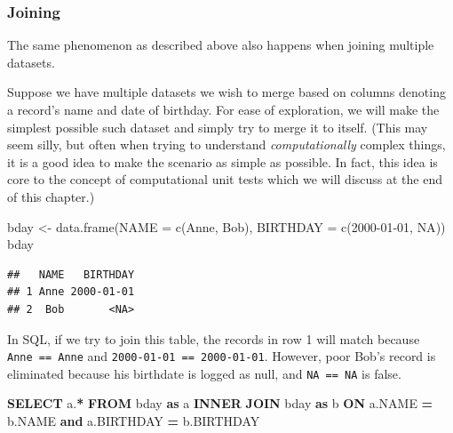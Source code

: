 \documentclass[
]{krantz}
\makeatletter
\newenvironment{Shaded}{\begin{snugshade}}{\end{snugshade}}
\newcommand{\AttributeTok}[1]{\textcolor[rgb]{0.61,0.61,0.61}{#1}}
\newcommand{\ConstantTok}[1]{\textcolor[rgb]{0,0,0}{#1}}
\newcommand{\FunctionTok}[1]{\textcolor[rgb]{0,0,0}{#1}}
\newcommand{\KeywordTok}[1]{\textcolor[rgb]{0.27,0.27,0.27}{\textbf{#1}}}
\newcommand{\NormalTok}[1]{#1}
\newcommand{\OperatorTok}[1]{\textcolor[rgb]{0.43,0.43,0.43}{\textbf{#1}}}
\newcommand{\OtherTok}[1]{\textcolor[rgb]{0.37,0.37,0.37}{#1}}
\newcommand{\StringTok}[1]{\textcolor[rgb]{0.5,0.5,0.5}{#1}}
\newenvironment{kframe}{%
\medskip{}
\setlength{\fboxsep}{.8em}
 \def\at@end@of@kframe{}%
 \ifinner\ifhmode%
  \def\at@end@of@kframe{\end{minipage}}%
  \begin{minipage}{\columnwidth}%
 \fi\fi%
 \def\FrameCommand##1{\hskip\@totalleftmargin \hskip-\fboxsep
 \colorbox{shadecolor}{##1}\hskip-\fboxsep
     \hskip-\linewidth \hskip-\@totalleftmargin \hskip\columnwidth}%
 \MakeFramed {\advance\hsize-\width
   \@totalleftmargin\z@ \linewidth\hsize
   \@setminipage}}%
 {\par\unskip\endMakeFramed%
 \at@end@of@kframe}
\renewenvironment{Shaded}{\begin{kframe}}{\end{kframe}}
\makeatother
\begin{document}
\hypertarget{joining}{%
\subsubsection{Joining}\label{joining}}

The same phenomenon as described above also happens when joining multiple datasets.

Suppose we have multiple datasets we wish to merge based on columns denoting a record's name and date of birthday.
For ease of exploration, we will make the simplest possible such dataset and simply try to merge it to itself.
(This may seem silly, but often when trying to understand \emph{computationally} complex things, it is a good idea to make the scenario as simple as possible.
In fact, this idea is core to the concept of computational unit tests which we will discuss at the end of this chapter.)

\begin{Shaded}
\begin{Highlighting}[]
\NormalTok{bday }\OtherTok{\textless{}{-}} \FunctionTok{data.frame}\NormalTok{(}\AttributeTok{NAME =} \FunctionTok{c}\NormalTok{(}\StringTok{\textquotesingle{}Anne\textquotesingle{}}\NormalTok{, }\StringTok{\textquotesingle{}Bob\textquotesingle{}}\NormalTok{), }\AttributeTok{BIRTHDAY =} \FunctionTok{c}\NormalTok{(}\StringTok{\textquotesingle{}2000{-}01{-}01\textquotesingle{}}\NormalTok{, }\ConstantTok{NA}\NormalTok{))}
\NormalTok{bday}
\end{Highlighting}
\end{Shaded}

\begin{verbatim}
##   NAME   BIRTHDAY
## 1 Anne 2000-01-01
## 2  Bob       <NA>
\end{verbatim}

In SQL, if we try to join this table, the records in row 1 will match because \texttt{\textquotesingle{}Anne\textquotesingle{}\ ==\ \textquotesingle{}Anne\textquotesingle{}} and \texttt{\textquotesingle{}2000-01-01\textquotesingle{}\ ==\ \textquotesingle{}2000-01-01\textquotesingle{}}.
However, poor Bob's record is eliminated because his birthdate is logged as null, and \texttt{NA\ ==\ NA} is false.

\begin{Shaded}
\begin{Highlighting}[]
\KeywordTok{SELECT}\NormalTok{ a.}\OperatorTok{*}
\KeywordTok{FROM}
\NormalTok{  bday }\KeywordTok{as}\NormalTok{ a}
  \KeywordTok{INNER} \KeywordTok{JOIN}
\NormalTok{  bday }\KeywordTok{as}\NormalTok{ b}
  \KeywordTok{ON}
\NormalTok{  a.NAME }\OperatorTok{=}\NormalTok{ b.NAME }\KeywordTok{and}
\NormalTok{  a.BIRTHDAY }\OperatorTok{=}\NormalTok{ b.BIRTHDAY}
\end{Highlighting}
\end{Shaded}
\end{document}
